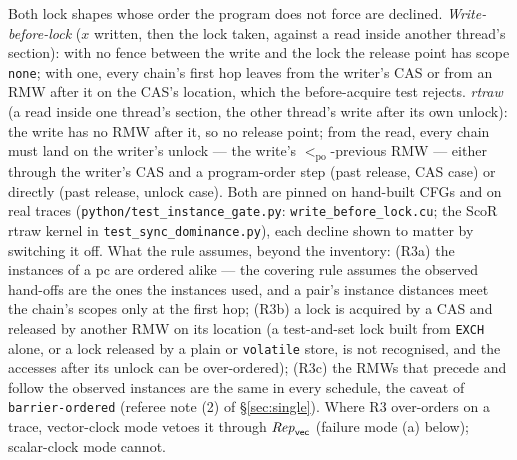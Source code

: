 \documentclass[11pt]{article}
\theoremstyle{remark}
\newcommand{\PO}{<_{\mathrm{po}}}\newcommand{\HB}{\to_{\mathrm{hb}}}\newcommand{\HBr}{\trianglelefteq_{\mathrm{hb}}}
\newcommand{\cls}[1]{\texttt{#1}}\newcommand{\M}{\mathsf{M}}
\begin{document}
Both lock shapes whose order the program does not force are declined. \emph{Write-before-lock}
($x$ written, then the lock taken, against a read inside another thread's section): with no
fence between the write and the lock the release point has scope \texttt{none}; with one, every
chain's first hop leaves from the writer's CAS or from an RMW after it on the CAS's location,
which the before-acquire test rejects. \emph{rtraw} (a read inside one thread's section, the
other thread's write after its own unlock): the write has no RMW after it, so no release point;
from the read, every chain must land on the writer's unlock --- the write's $\PO$-previous RMW
--- either through the writer's CAS and a program-order step (past release, CAS case) or
directly (past release, unlock case). Both are pinned on hand-built CFGs and on real traces
(\texttt{python/test\_instance\_gate.py}: \texttt{write\_before\_lock.cu}; the ScoR rtraw kernel
in \texttt{test\_sync\_dominance.py}), each decline shown to matter by switching it off. What the
rule assumes, beyond the inventory: (R3a) the instances of a pc are ordered alike --- the
covering rule assumes the observed hand-offs are the ones the instances used, and a pair's
instance distances meet the chain's scopes only at the first hop; (R3b) a lock is acquired by a
CAS and released by another RMW on its location (a test-and-set lock built from \texttt{EXCH}
alone, or a lock released by a plain or \texttt{volatile} store, is not recognised, and the
accesses after its unlock can be over-ordered); (R3c) the RMWs that precede and
follow the observed instances are the same in every schedule, the caveat of
\cls{barrier-ordered} (referee note (2) of \S\ref{sec:single}). Where R3 over-orders on a trace,
vector-clock mode vetoes it through $\mathit{Rep}_{\mathsf{vec}}$ (failure mode (a) below);
scalar-clock mode cannot.
\end{document}
